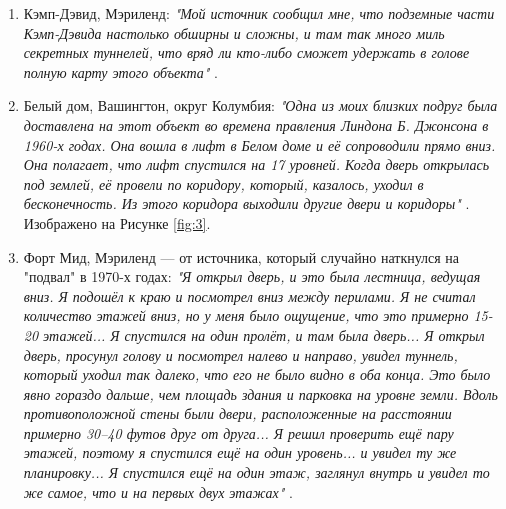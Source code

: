 \documentclass[10pt,twocolumn,letterpaper]{article}
\begin{document}
\begin{flushleft}
\begin{enumerate}
    \item Кэмп-Дэвид, Мэриленд: \textit{"Мой источник сообщил мне, что подземные части Кэмп-Дэвида настолько обширны и сложны, и там так много миль секретных туннелей, что вряд ли кто-либо сможет удержать в голове полную карту этого объекта"} \cite{22}.
    \item Белый дом, Вашингтон, округ Колумбия: \textit{"Одна из моих близких подруг была доставлена на этот объект во времена правления Линдона Б. Джонсона в 1960-х годах. Она вошла в лифт в Белом доме и её сопроводили прямо вниз. Она полагает, что лифт спустился на 17 уровней. Когда дверь открылась под землей, её провели по коридору, который, казалось, уходил в бесконечность. Из этого коридора выходили другие двери и коридоры"} \cite{22}. Изображено на Рисунке \ref{fig:3}.
    \item Форт Мид, Мэриленд — от источника, который случайно наткнулся на "подвал" в 1970-х годах: \textit{"Я открыл дверь, и это была лестница, ведущая вниз. Я подошёл к краю и посмотрел вниз между перилами. Я не считал количество этажей вниз, но у меня было ощущение, что это примерно 15-20 этажей... Я спустился на один пролёт, и там была дверь... Я открыл дверь, просунул голову и посмотрел налево и направо, увидел туннель, который уходил так далеко, что его не было видно в оба конца. Это было явно гораздо дальше, чем площадь здания и парковка на уровне земли. Вдоль противоположной стены были двери, расположенные на расстоянии примерно 30–40 футов друг от друга... Я решил проверить ещё пару этажей, поэтому я спустился ещё на один уровень... и увидел ту же планировку... Я спустился ещё на один этаж, заглянул внутрь и увидел то же самое, что и на первых двух этажах"} \cite{22}.
\end{enumerate}
\end{flushleft}
\end{document}
